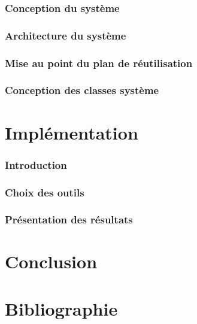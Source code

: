 \documentclass[12pt, a4paper]{report}
\begin{document}
    \subsection{Conception du système}\label{subsec:conception-du-systeme}
    \subsection{Architecture du système}\label{subsec:architecture-du-systeme}
    \subsection{Mise au point du plan de réutilisation}\label{subsec:mise-au-point-du-plan-de-reutilisation}
    \subsection{Conception des classes système}\label{subsec:conception-des-classes-systeme}
    
    \chapter{Implémentation}\label{sec:implementation}
    \subsection{Introduction}\label{subsec:introduction-implementation}
   	\subsection{Choix des outils}\label{subsec:choix-des-outils}
   	\subsection{Présentation des résultats}\label{subsec:presentation-des-resultats}
   	
    \chapter{Conclusion}\label{sec:conclusion}
    \chapter{Bibliographie}\label{sec:bibliographie}
\end{document}
